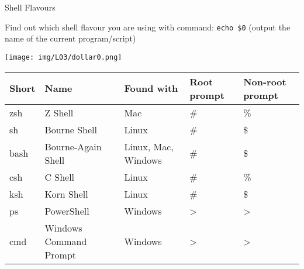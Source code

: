 \documentclass[hyperref={pdfpagelabels=false},aspectratio=169]{beamer}
\begin{document}
\begin{frame}{Shell Flavours}

Find out which shell flavour you are using with command: \texttt{echo \$0} (output the name of the current program/script)

\vspace{2pt}
\texttt{[image: img/L03/dollar0.png]}

\vspace{10pt}
    \centering
    \footnotesize
    \begin{tabular}{l|l|l|l|l}
        Short & Name & Found with &  Root prompt & Non-root prompt \\ \hline
        zsh & Z Shell & Mac & \# & \%\\
        sh & Bourne Shell & Linux & \# & \$\\
        bash & Bourne-Again Shell & Linux, Mac, Windows & \# & \$\\
        csh & C Shell & Linux & \# & \%\\
        ksh & Korn Shell & Linux & \# &\$\\
        ps & PowerShell & Windows & > & >\\
        cmd & Windows Command Prompt & Windows & > & > \\
    \end{tabular}
    
\end{frame}
\end{document}
